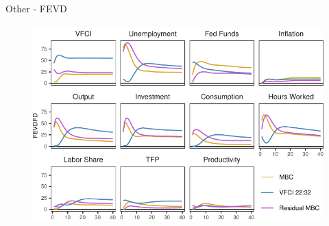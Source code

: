 \begin{frame}{Other - FEVD }
    
    \vspace{-0.25cm}
     
    \begin{figure}
        \includegraphics[height = 3in]{figs/fig10_fevd.pdf}
    \end{figure}   

\end{frame}